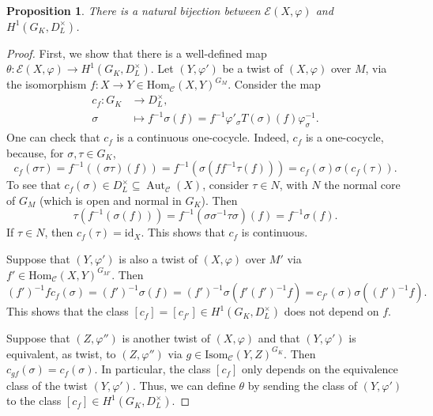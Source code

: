 \documentclass[a4paper,10pt]{amsart}
\theoremstyle{plain}
\newtheorem{proposition}[theorem]{Proposition}
\theoremstyle{definition}
\theoremstyle{remark}
\def\mr#1{\mathrm{#1}}
\def\Ccal{\mathcal{C}}
\newcommand{\bD}{D_L}
\renewcommand{\hom}{\mr{Hom}}
\DeclareMathOperator{\Aut}{Aut}
\begin{document}
\begin{proposition}\label{proposition: twists and cohomology}
There is a natural bijection between \(\mathcal{E}(X, \varphi)\) and \(H^1(G_K, \bD^\times)\).
\end{proposition}
\begin{proof}
First, we show that there is a well-defined map \(\theta \colon \mathcal{E}(X, \varphi) \to H^1(G_K, \bD^\times).\)
Let \((Y, \varphi')\) be a twist of \((X, \varphi)\) over \(M\), via the isomorphism \(f \colon X \to Y \in \hom_{\Ccal}(X, Y)^{G_M}\). Consider the map
\begin{align*}
    c_f \colon G_K &\longrightarrow \bD^\times, \\
    \sigma &\longmapsto f^{-1} \sigma(f) = f^{-1}\varphi'_{\sigma}T(\sigma)(f)\varphi_{\sigma}^{-1}.
\end{align*}
One can check that \(c_f\) is a continuous one-cocycle. Indeed, \(c_f\) is a one-cocycle, because, for \(\sigma, \tau \in G_K\),
\[
    c_f(\sigma\tau) = f^{-1}((\sigma \tau)(f)) = f^{-1}(\sigma(ff^{-1} \tau(f))) = c_f(\sigma)\sigma(c_f(\tau)).
\]
To see that \(c_f(\sigma) \in \bD^\times \subseteq \Aut_{\Ccal}(X)\), consider \(\tau \in N\), with \(N\) the normal core of \(G_M\) (which is open and normal in \(G_K\)). Then
\[
    \tau(f^{-1} (\sigma(f))) = f^{-1} (\sigma \sigma^{-1} \tau \sigma)(f) = f^{-1} \sigma(f).
\]
If \(\tau \in N\), then \(c_f(\tau) = \mr{id}_X\). This shows that \(c_f\) is continuous. 

Suppose that \((Y, \varphi')\) is also a twist of \((X, \varphi)\) over \(M'\) via \(f'\in \hom_{\Ccal}(X, Y)^{G_{M'}}\). Then
\[
    (f')^{-1}fc_f(\sigma) = (f')^{-1} \sigma(f) = (f')^{-1} \sigma (f'(f')^{-1}f) = c_{f'}(\sigma) \sigma((f')^{-1}f).
\]
This shows that the class \([c_f] = [c_{f'}] \in H^1(G_K, \bD^\times)\) does not depend on \(f\).

Suppose that \((Z, \varphi'')\) is another twist of \((X, \varphi)\) and that \((Y, \varphi')\) is equivalent, as twist, to \((Z, \varphi'')\) via \(g \in \mr{Isom}_{\Ccal}(Y, Z)^{G_K}\). Then \(c_{gf}(\sigma) = c_f(\sigma)\). In particular, the class \([c_f]\) only depends on the equivalence class of the twist \((Y, \varphi')\). Thus, we can define \(\theta\) by sending the class of \((Y, \varphi')\) to the class \([c_f] \in H^1(G_K, \bD^\times)\).


\end{proof}
\end{document}
